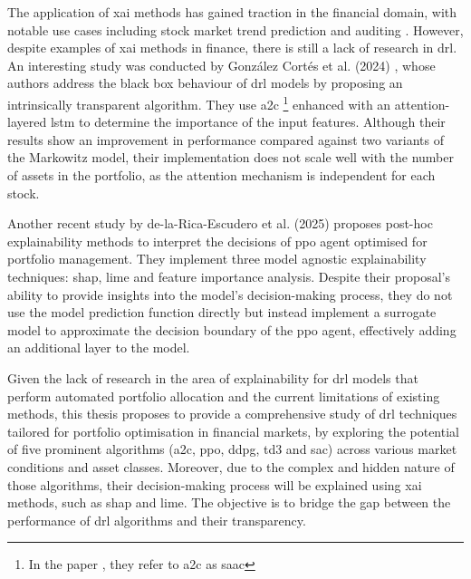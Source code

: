 The application of \acrshort{xai} methods has gained traction in the financial domain, with notable use cases including stock market trend prediction \cite{Mandeep2022} and auditing \cite{Zhang2022}. However, despite examples of \acrshort{xai} methods in finance, there is still a lack of research in \acrshort{drl}. An interesting study was conducted by González Cortés et al. (2024) \cite{Cortes2024}, whose authors address the black box behaviour of \acrshort{drl} models by proposing an intrinsically transparent algorithm. They use \acrfull{a2c} \footnote{In the paper \cite{Cortes2024}, they refer to \acrshort{a2c} as \acrfull{saac}} enhanced with an attention-layered \acrshort{lstm} to determine the importance of the input features. Although their results show an improvement in performance compared against two variants of the Markowitz model, their implementation does not scale well with the number of assets in the portfolio, as the attention mechanism is independent for each stock.

Another recent study by de-la-Rica-Escudero et al. (2025) \cite{de-La-Rica-Escudero2025} proposes post-hoc explainability methods to interpret the decisions of \acrshort{ppo} agent optimised for portfolio management. They implement three model agnostic explainability techniques: \acrshort{shap}, \acrshort{lime} and feature importance analysis. Despite their proposal's ability to provide insights into the model's decision-making process, they do not use the model prediction function directly but instead implement a surrogate model to approximate the decision boundary of the \acrshort{ppo} agent, effectively adding an additional layer to the model.

Given the lack of research in the area of explainability for \acrshort{drl} models that perform automated portfolio allocation and the current limitations of existing methods, this thesis proposes to provide a comprehensive study of  \acrshort{drl} techniques tailored for portfolio optimisation in financial markets, by exploring the potential of five prominent algorithms (\acrshort{a2c}, \acrshort{ppo}, \acrshort{ddpg}, \acrshort{td3} and \acrshort{sac}) across various market conditions and asset classes. Moreover, due to the complex and hidden nature of those algorithms, their decision-making process will be explained using \acrshort{xai} methods, such as \acrshort{shap} and \acrshort{lime}. The objective is to bridge the gap between the performance of \acrshort{drl} algorithms and their transparency.
